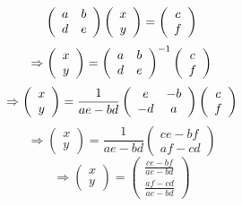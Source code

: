 {
		\[
			\left (
			\begin{array}{c c}
				a & b\\
				d & e
			\end{array}
			\right )
			\left (
			\begin{array}{c}
				x\\
				y
			\end{array}
			\right )
			=
			\left (
			\begin{array}{c}
				c\\
				f
			\end{array}
			\right )
		\]
			\pause 
		\[
			\Rightarrow
			\left (
			\begin{array}{c}
				x\\
				y
			\end{array}
			\right )
			=
			\left (
			\begin{array}{c c}
				a & b\\
				d & e
			\end{array}
			\right )^{-1}
			\left (
			\begin{array}{c}
				c\\
				f
			\end{array}
			\right )
		\]
			\pause 
		\[
			\Rightarrow
			\left (
			\begin{array}{c}
				x\\
				y
			\end{array}
			\right )
			=
			\frac{1}{ae - bd}
			\left (
			\begin{array}{c c}
				e & -b\\
				-d & a
			\end{array}
			\right )
			\left (
			\begin{array}{c}
				c\\
				f
			\end{array}
			\right )
		\]
			\pause 
		\[
			\Rightarrow
			\left (
			\begin{array}{c}
				x\\
				y
			\end{array}
			\right )
			=
			\frac{1}{ae - bd}
			\left (
			\begin{array}{c}
				ce - bf\\
				af - cd
			\end{array}
			\right )
		\]
			\pause 
		\[
			\Rightarrow
			\left (
			\begin{array}{c}
				x\\
				y
			\end{array}
			\right )
			=
			\left (
			\begin{array}{c}
			\frac{ce - bf}{ae - bd}\\
			\frac{af - cd}{ae - bd}
			\end{array}
			\right )
		\]
}

